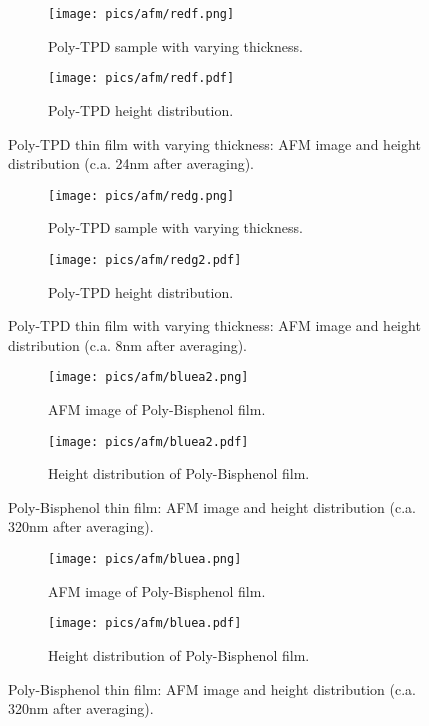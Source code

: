 \begin{figure}[!htb]
\centering
\begin{subfigure}[t]{.5\textwidth}
  \centering
  \texttt{[image: pics/afm/redf.png]}
  \caption{Poly-TPD sample with varying thickness.}
  \label{PolyTPD_VaryingThickness}
\end{subfigure}%
\begin{subfigure}[t]{.5\textwidth}
  \centering
  \texttt{[image: pics/afm/redf.pdf]}
  \caption{Poly-TPD height distribution.}
  \label{PolyTPD_HeightDistRedb}
\end{subfigure}
\caption{Poly-TPD thin film with varying thickness: AFM image and height distribution (c.a. 24nm after averaging).}
\end{figure}

\begin{figure}[!htb]
\centering
\begin{subfigure}[t]{.5\textwidth}
  \centering
  \texttt{[image: pics/afm/redg.png]}
  \caption{Poly-TPD sample with varying thickness.}
  \label{PolyTPD_VaryingThickness}
\end{subfigure}%
\begin{subfigure}[t]{.5\textwidth}
  \centering
  \texttt{[image: pics/afm/redg2.pdf]}
  \caption{Poly-TPD height distribution.}
  \label{PolyTPD_HeightDistRedb}
\end{subfigure}
\caption{Poly-TPD thin film with varying thickness: AFM image and height distribution (c.a. 8nm after averaging).}
\end{figure}

\begin{figure}[!htb]
\centering
\begin{subfigure}[t]{.5\textwidth}
  \centering
  \texttt{[image: pics/afm/bluea2.png]}
  \caption{AFM image of Poly-Bisphenol film.}
  \label{PolyBisphenol_AFM}
\end{subfigure}%
\begin{subfigure}[t]{.5\textwidth}
  \centering
  \texttt{[image: pics/afm/bluea2.pdf]}
  \caption{Height distribution of Poly-Bisphenol film.}
  \label{PolyBisphenol_HeightDist}
\end{subfigure}
\caption{Poly-Bisphenol thin film: AFM image and height distribution (c.a. 320nm after averaging).}
\end{figure}

\begin{figure}[!htb]
\centering
\begin{subfigure}[t]{.5\textwidth}
  \centering
  \texttt{[image: pics/afm/bluea.png]}
  \caption{AFM image of Poly-Bisphenol film.}
  \label{PolyBisphenol_AFM}
\end{subfigure}%
\begin{subfigure}[t]{.5\textwidth}
  \centering
  \texttt{[image: pics/afm/bluea.pdf]}
  \caption{Height distribution of Poly-Bisphenol film.}
  \label{PolyBisphenol_HeightDist}
\end{subfigure}
\caption{Poly-Bisphenol thin film: AFM image and height distribution (c.a. 320nm after averaging).}
\end{figure}

